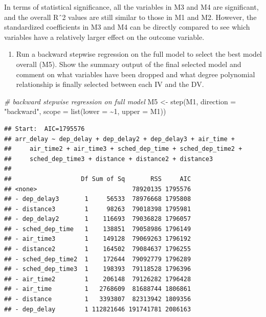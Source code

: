 \documentclass[
]{article}
\newenvironment{Shaded}{\begin{snugshade}}{\end{snugshade}}
\newcommand{\AttributeTok}[1]{\textcolor[rgb]{0.77,0.63,0.00}{#1}}
\newcommand{\CommentTok}[1]{\textcolor[rgb]{0.56,0.35,0.01}{\textit{#1}}}
\newcommand{\DecValTok}[1]{\textcolor[rgb]{0.00,0.00,0.81}{#1}}
\newcommand{\FunctionTok}[1]{\textcolor[rgb]{0.00,0.00,0.00}{#1}}
\newcommand{\NormalTok}[1]{#1}
\newcommand{\OtherTok}[1]{\textcolor[rgb]{0.56,0.35,0.01}{#1}}
\newcommand{\SpecialCharTok}[1]{\textcolor[rgb]{0.00,0.00,0.00}{#1}}
\newcommand{\StringTok}[1]{\textcolor[rgb]{0.31,0.60,0.02}{#1}}
\providecommand{\tightlist}{%
  \setlength{\itemsep}{0pt}\setlength{\parskip}{0pt}}
\begin{document}
In terms of statistical significance, all the variables in M3 and M4 are
significant, and the overall Rˆ2 values are still similar to those in M1
and M2. However, the standardized coefficients in M3 and M4 can be
directly compared to see which variables have a relatively larger effect
on the outcome variable.

\begin{enumerate}
\def\labelenumi{\alph{enumi}.}
\setcounter{enumi}{5}
\tightlist
\item
  Run a backward stepwise regression on the full model to select the
  best model overall (M5). Show the summary output of the final selected
  model and comment on what variables have been dropped and what degree
  polynomial relationship is finally selected between each IV and the
  DV.
\end{enumerate}

\begin{Shaded}
\begin{Highlighting}[]
\CommentTok{\# backward stepwise regression on full model}
\NormalTok{M5 }\OtherTok{\textless{}{-}} \FunctionTok{step}\NormalTok{(M1, }\AttributeTok{direction =} \StringTok{"backward"}\NormalTok{, }\AttributeTok{scope =} \FunctionTok{list}\NormalTok{(}\AttributeTok{lower =} \SpecialCharTok{\textasciitilde{}}\DecValTok{1}\NormalTok{,}
    \AttributeTok{upper =}\NormalTok{ M1))}
\end{Highlighting}
\end{Shaded}

\begin{verbatim}
## Start:  AIC=1795576
## arr_delay ~ dep_delay + dep_delay2 + dep_delay3 + air_time + 
##     air_time2 + air_time3 + sched_dep_time + sched_dep_time2 + 
##     sched_dep_time3 + distance + distance2 + distance3
## 
##                   Df Sum of Sq       RSS     AIC
## <none>                          78920135 1795576
## - dep_delay3       1     56533  78976668 1795808
## - distance3        1     98263  79018398 1795981
## - dep_delay2       1    116693  79036828 1796057
## - sched_dep_time   1    138851  79058986 1796149
## - air_time3        1    149128  79069263 1796192
## - distance2        1    164502  79084637 1796255
## - sched_dep_time2  1    172644  79092779 1796289
## - sched_dep_time3  1    198393  79118528 1796396
## - air_time2        1    206148  79126282 1796428
## - air_time         1   2768609  81688744 1806861
## - distance         1   3393807  82313942 1809356
## - dep_delay        1 112821646 191741781 2086163
\end{verbatim}
\end{document}
